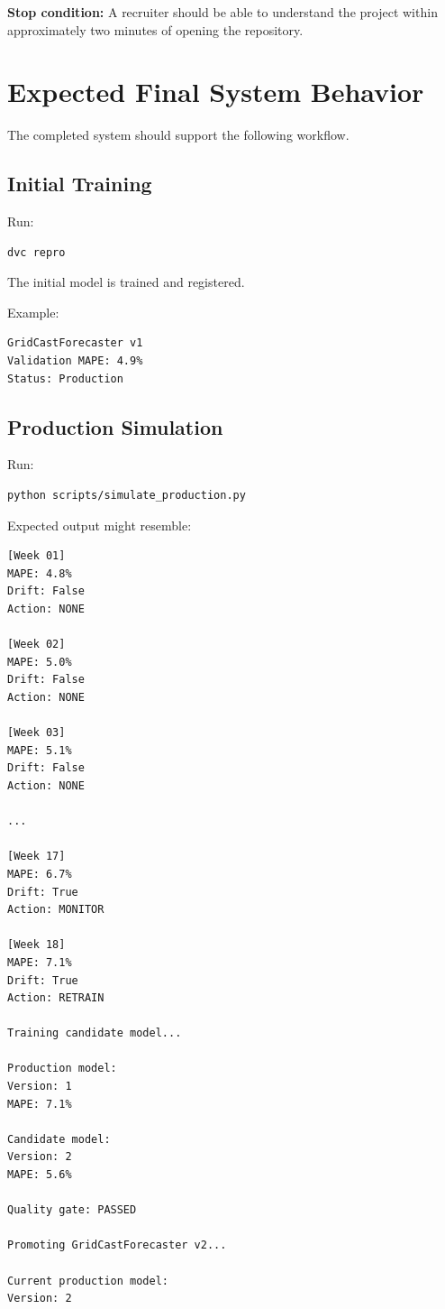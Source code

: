 \documentclass[11pt,a4paper]{article}
\begin{document}
\textbf{Stop condition:} A recruiter should be able to understand the project within approximately two minutes of opening the repository.

\newpage


\section{Expected Final System Behavior}

The completed system should support the following workflow.

\subsection{Initial Training}

Run:

\begin{lstlisting}[language=bash]
dvc repro
\end{lstlisting}

The initial model is trained and registered.

Example:

\begin{lstlisting}
GridCastForecaster v1
Validation MAPE: 4.9%
Status: Production
\end{lstlisting}

\subsection{Production Simulation}

Run:

\begin{lstlisting}[language=bash]
python scripts/simulate_production.py
\end{lstlisting}

Expected output might resemble:

\begin{lstlisting}
[Week 01]
MAPE: 4.8%
Drift: False
Action: NONE

[Week 02]
MAPE: 5.0%
Drift: False
Action: NONE

[Week 03]
MAPE: 5.1%
Drift: False
Action: NONE

...

[Week 17]
MAPE: 6.7%
Drift: True
Action: MONITOR

[Week 18]
MAPE: 7.1%
Drift: True
Action: RETRAIN

Training candidate model...

Production model:
Version: 1
MAPE: 7.1%

Candidate model:
Version: 2
MAPE: 5.6%

Quality gate: PASSED

Promoting GridCastForecaster v2...

Current production model:
Version: 2
\end{lstlisting}
\end{document}
